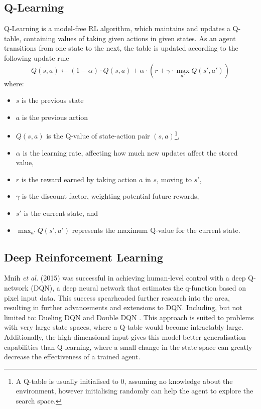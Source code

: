 \subsection{Q-Learning}
Q-Learning \cite{watkins1992q} is a model-free RL algorithm, which maintains and updates a Q-table, containing values of taking given actions in given states. As an agent transitions from one state to the next, the table is updated according to the following update rule
\[
Q(s, a) \leftarrow (1 - \alpha) \cdot Q(s, a) + \alpha \cdot \left( r + \gamma \cdot \max_{a'} Q(s', a') \right)
\]
where:
\begin{itemize}
    \item $s$ is the previous state
    \item $a$ is the previous action
    \item $Q(s, a)$ is the Q-value of state-action pair $(s, a)$\footnote{A Q-table is usually initialised to 0, assuming no knowledge about the environment, however initialising randomly can help the agent to explore the search space.},
    \item $\alpha$ is the learning rate, affecting how much new updates affect the stored value,
    \item $r$ is the reward earned by taking action $a$ in $s$, moving to $s'$,
    \item $\gamma$ is the discount factor, weighting potential future rewards,
    \item $s'$ is the current state, and
    \item $\max_{a'} Q(s', a')$ represents the maximum Q-value for the current state.
\end{itemize}
\subsection{Deep Reinforcement Learning}
Mnih \textit{et al.} (2015) \cite{mnih2015human} was successful in achieving human-level control with a deep Q-network (DQN), a deep neural network that estimates the q-function based on pixel input data. This success spearheaded further research into the area, resulting in further advancements and extensions to DQN. Including, but not limited to: Dueling DQN \cite{wang2016dueling} and Double DQN \cite{van2016doubleq}. This approach is suited to problems with very large state spaces, where a Q-table would become intractably large. Additionally, the high-dimensional input gives this model better generalisation capabilities than Q-learning, where a small change in the state space can greatly decrease the effectiveness of a trained agent.